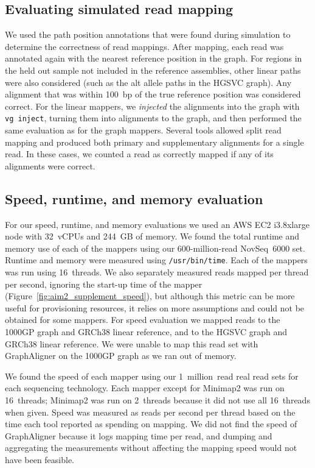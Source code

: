 \documentclass[11pt]{ucscthesis}
\begin{document}
\subsection{Evaluating simulated read mapping}

We used the path position annotations that were found during simulation to determine the correctness of read mappings.
After mapping, each read was annotated again with the nearest reference position in the graph.
For regions in the held out sample not included in the reference assemblies, other linear paths were also considered (such as the alt allele paths in the HGSVC graph).
Any alignment that was within 100~bp of the true reference position was considered correct.
For the linear mappers, we \textit{injected} the alignments into the graph with \texttt{vg~inject}, turning them into alignments to the graph, and then performed the same evaluation as for the graph mappers.
Several tools allowed split read mapping and produced both primary and supplementary alignments for a single read.
In these cases, we counted a read as correctly mapped if any of its alignments were correct.


\subsection{Speed, runtime, and memory evaluation}
\label{subsec:aim2:srgiraffe_speed}

For our speed, runtime, and memory evaluations we used an AWS EC2 i3.8xlarge node with 32~vCPUs and 244~GB of memory.
We found the total runtime and memory use of each of the mappers using our 600-million-read NovSeq~6000 set.
Runtime and memory were measured using \texttt{/usr/bin/time}.
Each of the mappers was run using 16~threads.
We also separately measured reads mapped per thread per second, ignoring the start-up time of the mapper (Figure~\ref{fig:aim2_supplement_speed}), but although this metric can be more useful for provisioning resources, it relies on more assumptions and could not be obtained for some mappers.
For speed evaluation we mapped reads to the 1000GP graph and GRCh38 linear reference, and to the HGSVC graph and GRCh38 linear reference.
We were unable to map this read set with GraphAligner on the 1000GP graph as we ran out of memory.

We found the speed of each mapper using our 1~million~read real read sets for each sequencing technology.
Each mapper except for Minimap2 was run on 16~threads; Minimap2 was run on 2~threads because it did not use all 16~threads when given.
Speed was measured as reads per second per thread based on the time each tool reported as spending on mapping.
We did not find the speed of GraphAligner because it logs mapping time per read, and dumping and aggregating the measurements without affecting the mapping speed would not have been feasible.
\end{document}
